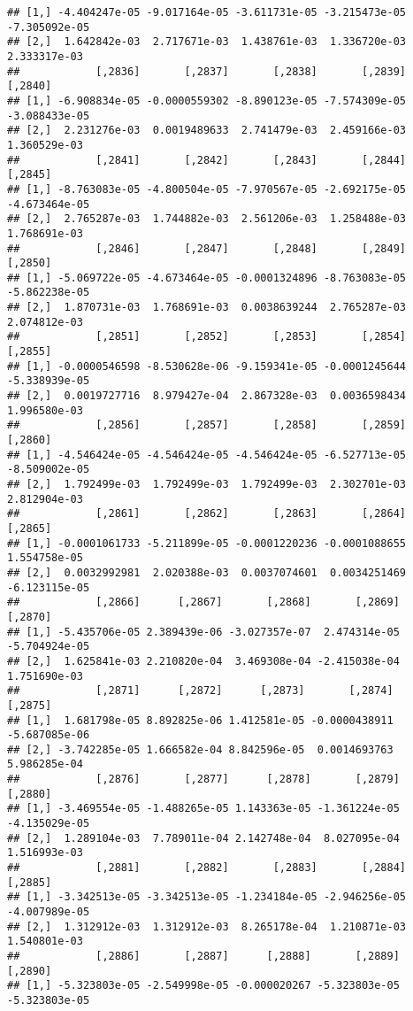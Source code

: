 \documentclass[
]{article}
\begin{document}
\begin{verbatim}
## [1,] -4.404247e-05 -9.017164e-05 -3.611731e-05 -3.215473e-05 -7.305092e-05
## [2,]  1.642842e-03  2.717671e-03  1.438761e-03  1.336720e-03  2.333317e-03
##            [,2836]       [,2837]       [,2838]       [,2839]       [,2840]
## [1,] -6.908834e-05 -0.0000559302 -8.890123e-05 -7.574309e-05 -3.088433e-05
## [2,]  2.231276e-03  0.0019489633  2.741479e-03  2.459166e-03  1.360529e-03
##            [,2841]       [,2842]       [,2843]       [,2844]       [,2845]
## [1,] -8.763083e-05 -4.800504e-05 -7.970567e-05 -2.692175e-05 -4.673464e-05
## [2,]  2.765287e-03  1.744882e-03  2.561206e-03  1.258488e-03  1.768691e-03
##            [,2846]       [,2847]       [,2848]       [,2849]       [,2850]
## [1,] -5.069722e-05 -4.673464e-05 -0.0001324896 -8.763083e-05 -5.862238e-05
## [2,]  1.870731e-03  1.768691e-03  0.0038639244  2.765287e-03  2.074812e-03
##            [,2851]       [,2852]       [,2853]       [,2854]       [,2855]
## [1,] -0.0000546598 -8.530628e-06 -9.159341e-05 -0.0001245644 -5.338939e-05
## [2,]  0.0019727716  8.979427e-04  2.867328e-03  0.0036598434  1.996580e-03
##            [,2856]       [,2857]       [,2858]       [,2859]       [,2860]
## [1,] -4.546424e-05 -4.546424e-05 -4.546424e-05 -6.527713e-05 -8.509002e-05
## [2,]  1.792499e-03  1.792499e-03  1.792499e-03  2.302701e-03  2.812904e-03
##            [,2861]       [,2862]       [,2863]       [,2864]       [,2865]
## [1,] -0.0001061733 -5.211899e-05 -0.0001220236 -0.0001088655  1.554758e-05
## [2,]  0.0032992981  2.020388e-03  0.0037074601  0.0034251469 -6.123115e-05
##            [,2866]      [,2867]       [,2868]       [,2869]       [,2870]
## [1,] -5.435706e-05 2.389439e-06 -3.027357e-07  2.474314e-05 -5.704924e-05
## [2,]  1.625841e-03 2.210820e-04  3.469308e-04 -2.415038e-04  1.751690e-03
##            [,2871]      [,2872]      [,2873]       [,2874]       [,2875]
## [1,]  1.681798e-05 8.892825e-06 1.412581e-05 -0.0000438911 -5.687085e-06
## [2,] -3.742285e-05 1.666582e-04 8.842596e-05  0.0014693763  5.986285e-04
##            [,2876]       [,2877]      [,2878]       [,2879]       [,2880]
## [1,] -3.469554e-05 -1.488265e-05 1.143363e-05 -1.361224e-05 -4.135029e-05
## [2,]  1.289104e-03  7.789011e-04 2.142748e-04  8.027095e-04  1.516993e-03
##            [,2881]       [,2882]       [,2883]       [,2884]       [,2885]
## [1,] -3.342513e-05 -3.342513e-05 -1.234184e-05 -2.946256e-05 -4.007989e-05
## [2,]  1.312912e-03  1.312912e-03  8.265178e-04  1.210871e-03  1.540801e-03
##            [,2886]       [,2887]      [,2888]       [,2889]       [,2890]
## [1,] -5.323803e-05 -2.549998e-05 -0.000020267 -5.323803e-05 -5.323803e-05

\end{verbatim}
\end{document}
